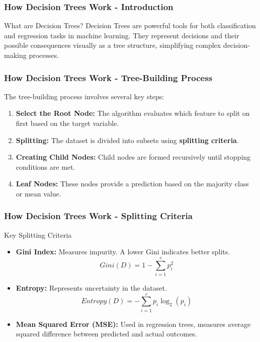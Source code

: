 \documentclass[aspectratio=169]{beamer}
\begin{document}
\begin{frame}[fragile]
    \frametitle{How Decision Trees Work - Introduction}
    \begin{block}{What are Decision Trees?}
        Decision Trees are powerful tools for both classification and regression tasks in machine learning. They represent decisions and their possible consequences visually as a tree structure, simplifying complex decision-making processes.
    \end{block}
\end{frame}

\begin{frame}[fragile]
    \frametitle{How Decision Trees Work - Tree-Building Process}
    The tree-building process involves several key steps:
    \begin{enumerate}
        \item \textbf{Select the Root Node:}
            The algorithm evaluates which feature to split on first based on the target variable.
        \item \textbf{Splitting:}
            The dataset is divided into subsets using \textbf{splitting criteria}.
        \item \textbf{Creating Child Nodes:}
            Child nodes are formed recursively until stopping conditions are met.
        \item \textbf{Leaf Nodes:}
            These nodes provide a prediction based on the majority class or mean value.
    \end{enumerate}
\end{frame}

\begin{frame}[fragile]
    \frametitle{How Decision Trees Work - Splitting Criteria}
    \begin{block}{Key Splitting Criteria}
        \begin{itemize}
            \item \textbf{Gini Index:} Measures impurity. A lower Gini indicates better splits.
                \begin{equation}
                Gini(D) = 1 - \sum_{i=1}^{c} p_i^2
                \end{equation}
            \item \textbf{Entropy:} Represents uncertainty in the dataset.
                \begin{equation}
                Entropy(D) = - \sum_{i=1}^{c} p_i \log_2(p_i)
                \end{equation}
            \item \textbf{Mean Squared Error (MSE):} Used in regression trees, measures average squared difference between predicted and actual outcomes.
        \end{itemize}
    \end{block}
\end{frame}
\end{document}
